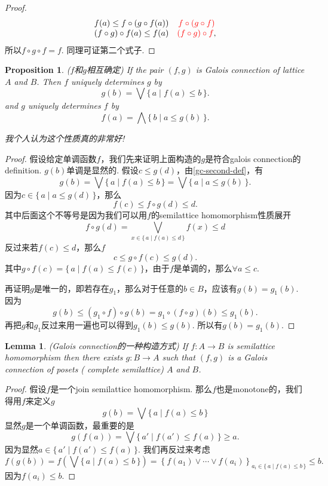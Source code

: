 \documentclass{article}
\newtheorem{lemma}[theorem]{Lemma}
\newtheorem{proposition}[theorem]{Proposition}
\newcommand*{\xfunc}[4]{{#2}\colon{#3}{#1}{#4}}
\newcommand*{\func}[3]{\xfunc{\to}{#1}{#2}{#3}}
\newcommand\Set[2]{\{\,#1\mid#2\,\}} %
\begin{document}
\begin{proof}
$$
\begin{array}{cc}
 f(a) \leq  f \circ (g \circ f(a)) & {\color{red} f \circ( g \circ f)} \\
 (f\circ g) \circ f(a) \leq f(a) & {\color{red}(f \circ g) \circ f}, \\
\end{array}
$$
所以$f \circ g \circ f  = f$. 同理可证第二个式子.
\end{proof}

\begin{proposition}
\rm {\color{red} ($f$和$g$相互确定)} If the pair $(f,g)$ is Galois connection of lattice $A$ and $B$. Then $f$ uniquely determines $g$ by
$$
g(b) = \bigvee\Set{a}{f(a) \leq b}.
$$
and $g$ uniquely determines $f$ by
$$
f(a) = \bigwedge\Set{b}{a \leq g(b)}.
$$

{\color{blue} 我个人认为这个性质真的非常好}!
\end{proposition}


\begin{proof}
假设给定单调函数$f$，我们先来证明上面构造的$g$是符合galois connection的definition. $g(b)$单调是显然的. 假设$c \leq g(d)$，由\ref{gc-second-def}，有
$$
g(b) = \bigvee\Set{a}{f(a) \leq b} = \bigvee\Set{a}{a \leq g(b)}.
$$
因为$c \in \Set{a}{a \leq g(d)}$，那么
$$
f(c) \leq f \circ g (d) \leq d.  
$$
其中后面这个不等号是因为我们可以用$f$的semilattice homomorphism性质展开
$$
f \circ g (d) = \bigvee_{x \in \Set{a}{f(a) \leq d}}f(x) \leq d  
$$
反过来若$f(c) \leq d$，那么$f$
$$
c \leq g \circ f(c) \leq g(d).
$$
其中$g \circ f(c) = \Set{a}{f(a) \leq f(c)}$，由于$f$是单调的，那么$\forall a \leq c$. 

再证明$g$是唯一的，即若存在$g_1$，那么对于任意的$b \in B$，应该有$g(b) = g_1(b)$. 因为
$$
g(b) \leq (g_1\circ f)\circ g(b) = g_1 \circ (f \circ g)(b) \leq g_1(b). 
$$
再把$g$和$g_1$反过来用一遍也可以得到$g_1(b) \leq g(b)$. 所以有$g(b) = g_1(b)$.
\end{proof}

\begin{lemma}
\rm {\color{red} (Galois connection的一种构造方式)} If $\func{f}{A}{B}$ is semilattice homomorphism then there exists $\func{g}{B}{A}$ such that $(f,g)$ is a Galois connection of posets ({\color{red} complete semilattice}) $A$ and $B$.
\end{lemma}

\begin{proof}
假设$f$是一个join semilattice homomorphism. 那么$f$也是monotone的，我们得用$f$来定义$g$
$$
g(b) = \bigvee\Set{a}{f(a) \leq b}
$$
显然$g$是一个单调函数，最重要的是
$$
g(f(a)) = \bigvee\Set{a'}{f(a') \leq f(a)} \geq a .
$$
因为显然$a \in \Set{a'}{f(a') \leq f(a)}$. 我们再反过来考虑
$$
f(g(b)) = f(\bigvee\Set{a}{f(a) \leq b}) = \left\{f(a_1)\vee \cdots \vee f(a_i)\right\}_{a_i \in \Set{a}{f(a) \leq b}} \leq b.
$$
因为$f(a_i) \leq b$.
\end{proof}
\end{document}
